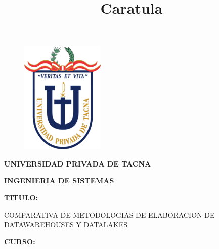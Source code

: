 \documentclass[12pt,letterpaper]{article}
\begin{document}
    \title{Caratula}
    \begin{titlepage}
        \begin{center}
            \begin{figure}[htb]
                \begin{center}
                    \includegraphics[width=4cm]{./img/logo}
                \end{center}
            \end{figure}
            \vspace*{0.15in}
            \begin{Large}
                \textbf{UNIVERSIDAD PRIVADA DE TACNA}\\
            \end{Large}
            \vspace*{0.1in}
            \begin{Large}
                \textbf{INGENIERIA DE SISTEMAS} \\
            \end{Large}
            \vspace*{0.5in}
            \begin{Large}
                \textbf{TITULO:}\\
            \end{Large}
            \vspace*{0.1in}
            \begin{Large}
                COMPARATIVA DE METODOLOGIAS DE ELABORACION DE DATAWAREHOUSES Y DATALAKES\\
            \end{Large}
            \vspace*{0.3in}
            \begin{Large}
                \textbf{CURSO:} \\
            \end{Large}
            \vspace*{0.1in}
            \begin{large}

\end{large}
\end{center}
\end{titlepage}
\end{document}
